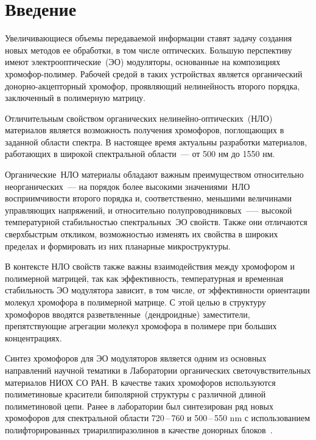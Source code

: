 \section{Введение}
Увеличивающиеся объемы передаваемой информации ставят задачу создания новых методов ее обработки, в том числе оптических. Большую перспективу имеют электрооптические~(ЭО) модуляторы, основанные на композициях хромофор-полимер. Рабочей средой в таких устройствах является органический донорно-акцепторный хромофор, проявляющий нелинейность второго порядка, заключенный в полимерную матрицу.

Отличительным свойством органических нелинейно-оптических~(НЛО) материалов является возможность получения хромофоров, поглощающих в заданной области спектра. В настоящее время актуальны разработки материалов, работающих в широкой спектральной области~–-- от 500 нм до 1550 нм.

Органические~НЛО материалы обладают важным преимуществом относительно неорганических~--- на порядок более высокими значениями~НЛО восприимчивости второго порядка и, соответственно, меньшими величинами управляющих напряжений, и относительно полупроводниковых~—-- высокой температурной стабильностью спектральных~ЭО свойств. Также они отличаются сверхбыстрым откликом, возможностью изменять их свойства в широких пределах и формировать из них планарные микроструктуры.

В контексте НЛО свойств также важны взаимодействия между хромофором и полимерной матрицей, так как эффективность, температурная и временная стабильность  ЭО модулятора зависит, в том числе, от эффективности ориентации молекул хромофора в полимерной матрице. С этой целью в структуру хромофоров вводятся разветвленные~(дендроидные) заместители, препятствующие агрегации молекул хромофора в полимере при больших концентрациях. 

Синтез хромофоров для ЭО модуляторов является одним из основных направлений научной тематики в Лаборатории органических светочувствительных материалов НИОХ СО РАН. В качестве таких хромофоров используются полиметиновые красители биполярной структуры с различной длиной полиметиновой цепи. Ранее в лаборатории был синтезирован ряд новых хромофоров для спектральной области 720\,--\,760 и 500\,--\,550 \si{\nano\metre} с использованием полифторированных триарилпиразолинов в качестве донорных блоков~\cite{2019, 2019b}.

